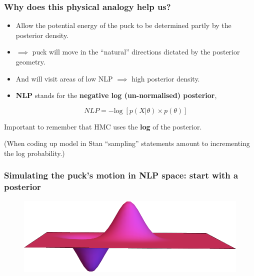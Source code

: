\documentclass[handout]{beamer}
\begin{document}
\begin{frame}
	\frametitle{Why does this physical analogy help us?}
	
	\begin{itemize}
		\item<2-> Allow the potential energy of the puck to be determined partly by the posterior density.
		\item<3-> $\implies$ puck will move in the ``natural'' directions dictated by the posterior geometry.
		\item<4-> And will visit areas of low NLP $\implies$ high posterior density.
		\item<5-> \textbf{NLP} stands for the \textbf{negative log (un-normalised) posterior},
		
		\begin{equation}
			NLP = - \text{log}\; \left[p(X|\theta) \times p(\theta) \right]
		\end{equation}
		
	\end{itemize}
	
	 Important to remember that HMC uses the \textbf{log} of the posterior.
	
	 (When coding up model in Stan ``sampling'' statements amount to incrementing the log probability.)
	
\end{frame}

\begin{frame}
	\frametitle{Simulating the puck's motion in NLP space: start with a posterior}
	
	\begin{figure}[ht]
		\centerline{\includegraphics[width=1\textwidth]{./Figures/lec5_nlpPosteriorOnly.png}}
	\end{figure}
	
\end{frame}
\end{document}
